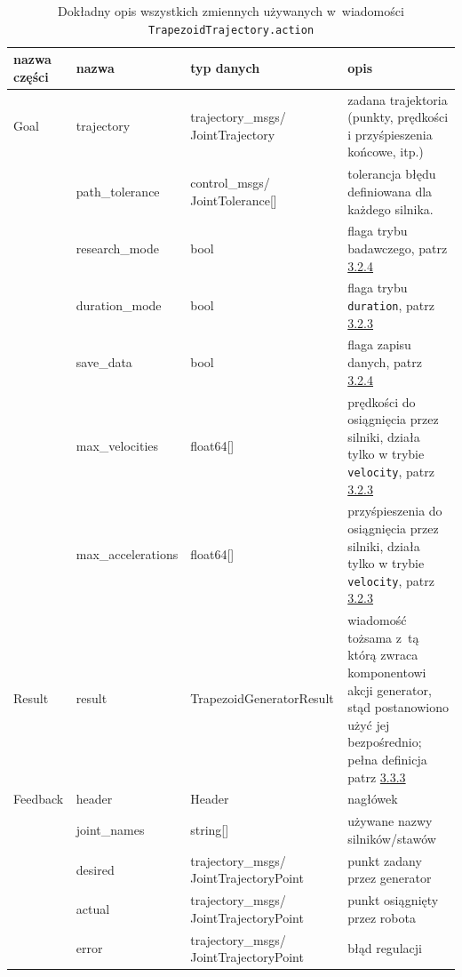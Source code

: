 \documentclass[a4paper, 12pt]{article}
\begin{document}
	\begin{table}[H]
	\label{tab:actionparams}
	\centering
	\begin{tabular}{|m{4em}|m{8em}|m{12em}|m{13em}|}
	\hline
	nazwa części & nazwa & typ danych & opis\\
	\hline
	\hline
	Goal & trajectory & trajectory\_msgs/ JointTrajectory\cite{jtm} & zadana trajektoria (punkty, prędkości i przyśpieszenia końcowe, itp.) \\  
	\cline{2-4}
	& path\_tolerance & control\_msgs/ JointTolerance[]\cite{cmjtm}&tolerancja błędu definiowana dla każdego silnika.\\
	\cline{2-4}
	& research\_mode & bool & flaga trybu badawczego, patrz \hyperref[sec:flags]{3.2.4}\\
	\cline{2-4}
	& duration\_mode & bool & flaga trybu \texttt{duration}, patrz \hyperref[sec:veldurdiff]{3.2.3}\\
	\cline{2-4}
	& save\_data & bool & flaga zapisu danych, patrz \hyperref[sec:flags]{3.2.4}\\
	\cline{2-4}
	& max\_velocities & float64[] & prędkości do osiągnięcia przez silniki, działa tylko w trybie \texttt{velocity}, patrz \hyperref[sec:veldurdiff]{3.2.3}\\
	\cline{2-4}
	& max\_accelerations & float64[] & przyśpieszenia do osiągnięcia przez silniki, działa tylko w trybie \texttt{velocity}, patrz \hyperref[sec:veldurdiff]{3.2.3}\\
	\hline
	Result & result & TrapezoidGeneratorResult & wiadomość tożsama z~tą którą zwraca komponentowi akcji generator, stąd postanowiono użyć jej bezpośrednio; pełna definicja patrz \hyperref[sec:msgsresult]{3.3.3}\\
	\hline
	Feedback & header & Header & nagłówek\\
	\cline{2-4}
	& joint\_names & string[] & używane nazwy silników/stawów\\
	\cline{2-4}
	& desired & trajectory\_msgs/ JointTrajectoryPoint\cite{jtpm} & punkt zadany przez generator\\
	\cline{2-4}
	& actual & trajectory\_msgs/ JointTrajectoryPoint\cite{jtpm} & punkt osiągnięty przez robota\\
	\cline{2-4}
	& error & trajectory\_msgs/ JointTrajectoryPoint\cite{jtpm} & błąd regulacji\\
	\hline
	\end{tabular}
	\caption{Dokładny opis wszystkich zmiennych używanych w~wiadomości \texttt{TrapezoidTrajectory.action}}
	\end{table}
	
\end{document}
